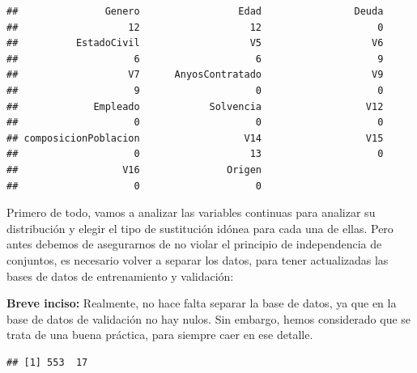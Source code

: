 \documentclass[
]{article}
\newenvironment{Shaded}{\begin{snugshade}}{\end{snugshade}}
\newcommand{\CommentTok}[1]{\textcolor[rgb]{0.56,0.35,0.01}{\textit{#1}}}
\newcommand{\FunctionTok}[1]{\textcolor[rgb]{0.13,0.29,0.53}{\textbf{#1}}}
\newcommand{\NormalTok}[1]{#1}
\newcommand{\OtherTok}[1]{\textcolor[rgb]{0.56,0.35,0.01}{#1}}
\newcommand{\SpecialCharTok}[1]{\textcolor[rgb]{0.81,0.36,0.00}{\textbf{#1}}}
\newcommand{\StringTok}[1]{\textcolor[rgb]{0.31,0.60,0.02}{#1}}
\begin{document}
\begin{verbatim}
##               Genero                 Edad                Deuda 
##                   12                   12                    0 
##          EstadoCivil                   V5                   V6 
##                    6                    6                    9 
##                   V7      AnyosContratado                   V9 
##                    9                    0                    0 
##             Empleado            Solvencia                  V12 
##                    0                    0                    0 
## composicionPoblacion                  V14                  V15 
##                    0                   13                    0 
##                  V16               Origen 
##                    0                    0
\end{verbatim}

Primero de todo, vamos a analizar las variables continuas para analizar
su distribución y elegir el tipo de sustitución idónea para cada una de
ellas. Pero antes debemos de asegurarnos de no violar el principio de
independencia de conjuntos, es necesario volver a separar los datos,
para tener actualizadas las bases de datos de entrenamiento y
validación:

\textbf{Breve inciso:} Realmente, no hace falta separar la base de
datos, ya que en la base de datos de validación no hay nulos. Sin
embargo, hemos considerado que se trata de una buena práctica, para
siempre caer en ese detalle.

\begin{Shaded}
\end{Shaded}

\begin{verbatim}
## [1] 553  17
\end{verbatim}
\end{document}
